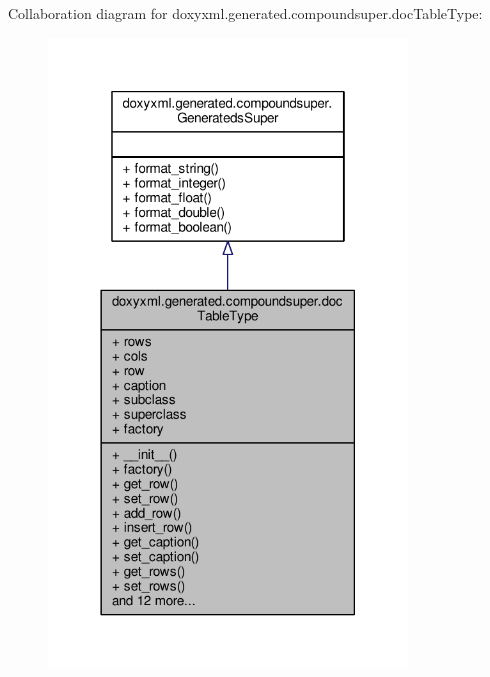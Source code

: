 Collaboration diagram for doxyxml.\+generated.\+compoundsuper.\+doc\+Table\+Type\+:
\nopagebreak
\begin{figure}[H]
\begin{center}
\leavevmode
\includegraphics[width=270pt]{de/dc1/classdoxyxml_1_1generated_1_1compoundsuper_1_1docTableType__coll__graph}
\end{center}
\end{figure}
